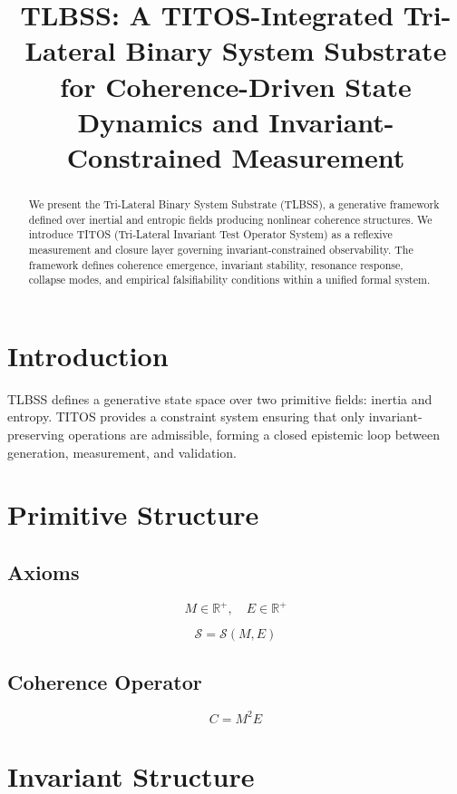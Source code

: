\documentclass[conference]{IEEEtran}
\title{TLBSS: A TITOS-Integrated Tri-Lateral Binary System Substrate for Coherence-Driven State Dynamics and Invariant-Constrained Measurement}
\author{
    \IEEEauthorblockN{Anonymous Framework}
    \IEEEauthorblockA{Systems Theory Division}
    \IEEEauthorblockA{Obienova}
}
\begin{document}
\maketitle

\begin{abstract}
We present the Tri-Lateral Binary System Substrate (TLBSS), a generative framework defined over inertial and entropic fields producing nonlinear coherence structures. We introduce TITOS (Tri-Lateral Invariant Test Operator System) as a reflexive measurement and closure layer governing invariant-constrained observability. The framework defines coherence emergence, invariant stability, resonance response, collapse modes, and empirical falsifiability conditions within a unified formal system.
\end{abstract}

\section{Introduction}
TLBSS defines a generative state space over two primitive fields: inertia and entropy. TITOS provides a constraint system ensuring that only invariant-preserving operations are admissible, forming a closed epistemic loop between generation, measurement, and validation.

\section{Primitive Structure}

\subsection{Axioms}

\begin{equation}
M \in \mathbb{R}^+, \quad E \in \mathbb{R}^+
\end{equation}

\begin{equation}
\mathcal{S} = \mathcal{S}(M,E)
\end{equation}

\subsection{Coherence Operator}

\begin{equation}
C = M^2 E
\end{equation}

\section{Invariant Structure}
\end{document}
